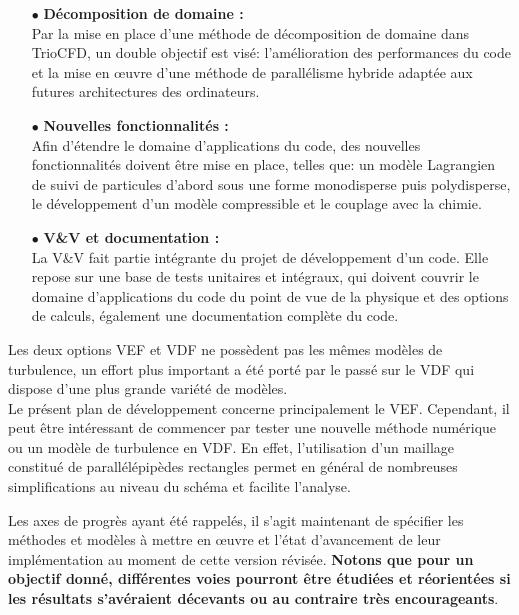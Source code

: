 \begin{itemize}
Il est n\'ecessaire de mettre en place un cadre m\'ethodologique rigoureux permettant d'\'evaluer la cr\'edibilit\'e de r\'esultats de simulations.
Le volet pr\'ediction des incertitudes concerne diff\'erents aspects, parmi lesquels  l'estimation des erreurs, l'analyse de sensibilit\'e, et est couvert en grande partie par la plateforme URANIE.\\
\item [$\bullet$]
{\bf{D\'ecomposition de domaine : }}\\
Par la mise en place d'une m\'ethode de d\'ecomposition de domaine dans TrioCFD, un double objectif est vis\'e: l'am\'elioration des performances du code et la mise en {\oe}uvre d'une m\'ethode de parall\'elisme hybride adapt\'ee aux futures architectures des ordinateurs.\\
\item [$\bullet$]
{\bf{ Nouvelles fonctionnalit\'es : }}\\
Afin d'\'etendre le domaine d'applications du code, des nouvelles fonctionnalit\'es doivent \^etre mise en place, telles que: un mod\`ele Lagrangien de suivi de particules d'abord sous une forme monodisperse puis polydisperse, le d\'eveloppement d'un mod\`ele compressible et le couplage avec la chimie.\\
\item [$\bullet$]
{\bf{ V\&V et documentation : }}\\
La V\&V fait partie int\'egrante du projet de d\'eveloppement d'un code. Elle repose sur une base de tests unitaires et int\'egraux, qui doivent couvrir le domaine d'applications du code du point de vue de la physique et des options de calculs, \'egalement une documentation compl\`ete du code. 

\end{itemize}


Les deux options VEF et VDF ne poss\`edent pas les m\^emes mod\`eles de turbulence, un effort plus important a \'et\'e port\'e par le pass\'e sur le VDF qui dispose d'une plus grande vari\'et\'e de mod\`eles. \\
Le pr\'esent plan de d\'eveloppement concerne principalement le VEF. 
Cependant, il peut \^etre int\'eressant de commencer par tester une nouvelle m\'ethode num\'erique ou un mod\`ele de turbulence en VDF. En effet, l'utilisation d'un maillage constitu\'e de parall\'el\'epip\`edes rectangles permet en g\'en\'eral de nombreuses simplifications au niveau du sch\'ema et facilite l'analyse. 

Les axes de progr\`es ayant \'et\'e rappel\'es, il s'agit maintenant de sp\'ecifier les m\'ethodes et mod\`eles \`a mettre en {\oe}uvre et l'\'etat d'avancement de leur
impl\'ementation au moment de cette version r\'evis\'ee.  \textbf{Notons que pour un objectif donn\'e, diff\'erentes voies pourront \^etre \'etudi\'ees et r\'eorient\'ees si les r\'esultats s'av\'eraient d\'ecevants ou au contraire tr\`es encourageants}. 

